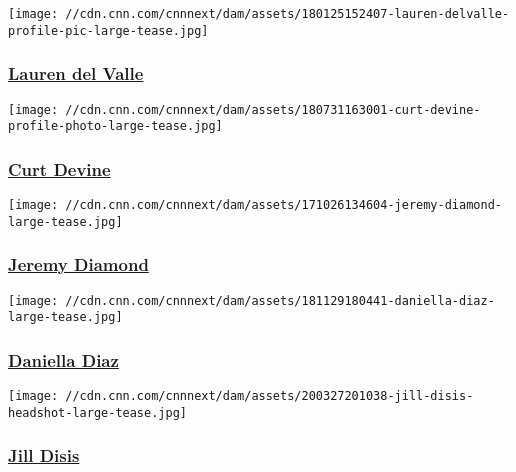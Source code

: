 \href{/profiles/lauren-del-valle}{}

\texttt{[image: //cdn.cnn.com/cnnnext/dam/assets/180125152407-lauren-delvalle-profile-pic-large-tease.jpg]}

\hypertarget{lauren-del-valle}{%
\subsubsection{\texorpdfstring{\href{/profiles/lauren-del-valle}{Lauren
del Valle}}{Lauren del Valle}}\label{lauren-del-valle}}

\href{/profiles/curt-devine}{}

\texttt{[image: //cdn.cnn.com/cnnnext/dam/assets/180731163001-curt-devine-profile-photo-large-tease.jpg]}

\hypertarget{curt-devine}{%
\subsubsection{\texorpdfstring{\href{/profiles/curt-devine}{Curt
Devine}}{Curt Devine}}\label{curt-devine}}

\href{/profiles/jeremy-diamond}{}

\texttt{[image: //cdn.cnn.com/cnnnext/dam/assets/171026134604-jeremy-diamond-large-tease.jpg]}

\hypertarget{jeremy-diamond}{%
\subsubsection{\texorpdfstring{\href{/profiles/jeremy-diamond}{Jeremy
Diamond}}{Jeremy Diamond}}\label{jeremy-diamond}}

\href{/profiles/daniella-diaz}{}

\texttt{[image: //cdn.cnn.com/cnnnext/dam/assets/181129180441-daniella-diaz-large-tease.jpg]}

\hypertarget{daniella-diaz}{%
\subsubsection{\texorpdfstring{\href{/profiles/daniella-diaz}{Daniella
Diaz}}{Daniella Diaz}}\label{daniella-diaz}}

\href{/profiles/jill-disis}{}

\texttt{[image: //cdn.cnn.com/cnnnext/dam/assets/200327201038-jill-disis-headshot-large-tease.jpg]}

\hypertarget{jill-disis}{%
\subsubsection{\texorpdfstring{\href{/profiles/jill-disis}{Jill
Disis}}{Jill Disis}}\label{jill-disis}}

